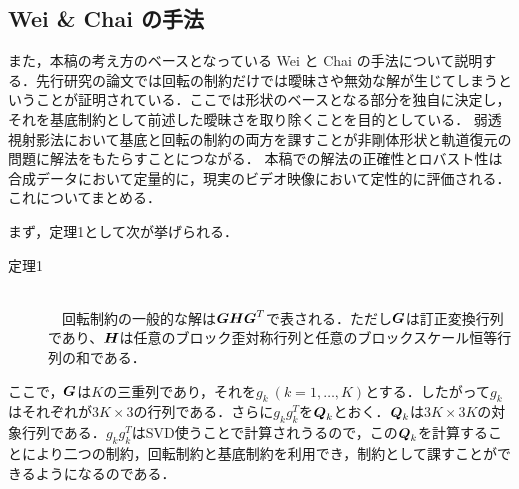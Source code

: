 \documentclass[a4paper,10pt]{jarticle}
\begin{document}
\subsection{Wei \& Chai の手法}
%
また，本稿の考え方のベースとなっている Wei と Chai の手法について説明する．先行研究の論文では回転の制約だけでは曖昧さや無効な解が生じてしまうということが証明されている．ここでは形状のベースとなる部分を独自に決定し，それを基底制約として前述した曖昧さを取り除くことを目的としている．
弱透視射影法において基底と回転の制約の両方を課すことが非剛体形状と軌道復元の問題に解法をもたらすことにつながる．
本稿での解法の正確性とロバスト性は合成データにおいて定量的に，現実のビデオ映像において定性的に評価される．これについてまとめる．

まず，定理1として次が挙げられる．
%
\begin{description}
 \item[定理1]\mbox{}\\
　回転制約の一般的な解は$ \mbox{\boldmath $ G $} \mbox{\boldmath $ H $} \mbox{\boldmath $ G $}^T $で表される．ただし$ \mbox{\boldmath $ G $} $は訂正変換行列であり、$ \mbox{\boldmath $ H $} $は任意のブロック歪対称行列と任意のブロックスケール恒等行列の和である．
\end{description}
%
ここで，$ \mbox{\boldmath $ G $} $は$ K $の三重列であり，それを$ g_k ~ (k=1, \dots , K) $とする．したがって$ g_k $はそれぞれが$ 3K \times 3 $の行列である．さらに$ g_k g^T_k $を$ \mbox{\boldmath $ Q $}_k $とおく．$ \mbox{\boldmath $ Q $}_k $は$ 3K \times 3K $の対象行列である．$ g_k g^T_k $はSVD使うことで計算されうるので，この$ \mbox{\boldmath $ Q $}_k $を計算することにより二つの制約，回転制約と基底制約を利用でき，制約として課すことができるようになるのである．
\end{document}
